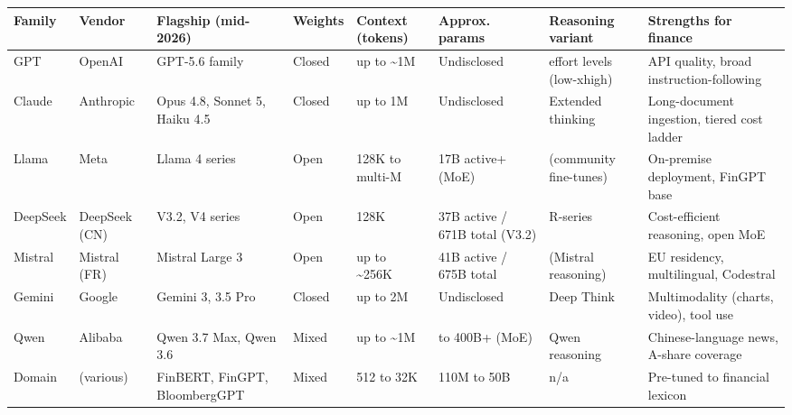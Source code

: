 \bigskip\noindent
\begin{tabular}{p{}p{}p{}p{}p{}p{}p{}p{}}
\toprule
Family & Vendor & Flagship (mid-2026) & Weights & Context (tokens) & Approx. params & Reasoning variant & Strengths for finance \\
\hline
GPT & OpenAI & GPT-5.6 family & Closed & up to {\textasciitilde}1M & Undisclosed & effort levels (low-xhigh) & API quality, broad instruction-following \\
Claude & Anthropic & Opus 4.8, Sonnet 5, Haiku 4.5 & Closed & up to 1M & Undisclosed & Extended thinking & Long-document ingestion, tiered cost ladder \\
Llama & Meta & Llama 4 series & Open & 128K to multi-M & 17B active+ (MoE) & (community fine-tunes) & On-premise deployment, FinGPT base \\
DeepSeek & DeepSeek (CN) & V3.2, V4 series & Open & 128K & 37B active / 671B total (V3.2) & R-series & Cost-efficient reasoning, open MoE \\
Mistral & Mistral (FR) & Mistral Large 3 & Open & up to {\textasciitilde}256K & 41B active / 675B total & (Mistral reasoning) & EU residency, multilingual, Codestral \\
Gemini & Google & Gemini 3, 3.5 Pro & Closed & up to 2M & Undisclosed & Deep Think & Multimodality (charts, video), tool use \\
Qwen & Alibaba & Qwen 3.7 Max, Qwen 3.6 & Mixed & up to {\textasciitilde}1M & to 400B+ (MoE) & Qwen reasoning & Chinese-language news, A-share coverage \\
Domain & (various) & FinBERT, FinGPT, BloombergGPT & Mixed & 512 to 32K & 110M to 50B & n/a & Pre-tuned to financial lexicon \\
\bottomrule
\end{tabular}

\bigskip

